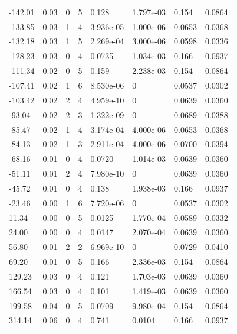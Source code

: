 \documentclass[preview]{standalone}
\begin{document}
{{\begin{tabular}{L{1.2cm}C{1.2cm} C{0.3cm}C{0.5cm} C{1.4cm}C{1.4cm} C{1.4cm}C{1.4cm}}
  -142.01  &  0.03  & 0     &  5 &  0.128  & 1.797e-03  & 0.154 &  0.0864   \\ 
  -133.85  &  0.03  & 1     &  4 &  3.936e-05  & 1.000e-06  & 0.0653 &  0.0368   \\ 
  -132.18  &  0.03  & 1     &  5 &  2.269e-04  & 3.000e-06  & 0.0598 &  0.0336   \\ 
  -128.23  &  0.03  & 0     &  4 &  0.0735  & 1.034e-03  & 0.166 &  0.0937   \\ 
  -111.34  &  0.02  & 0     &  5 &  0.159  & 2.238e-03  & 0.154 &  0.0864   \\ 
  -107.41  &  0.02  & 1     &  6 &  8.530e-06  & 0  & 0.0537 &  0.0302   \\ 
  -103.42  &  0.02  & 2     &  4 &  4.959e-10  & 0  & 0.0639 &  0.0360   \\ 
  -93.04  &  0.02  & 2     &  3 &  1.322e-09  & 0  & 0.0689 &  0.0388   \\ 
  -85.47  &  0.02  & 1     &  4 &  3.174e-04  & 4.000e-06  & 0.0653 &  0.0368   \\ 
  -84.13  &  0.02  & 1     &  3 &  2.911e-04  & 4.000e-06  & 0.0700 &  0.0394   \\ 
  -68.16  &  0.01  & 0     &  4 &  0.0720  & 1.014e-03  & 0.0639 &  0.0360   \\ 
  -51.11  &  0.01  & 2     &  4 &  7.980e-10  & 0  & 0.0639 &  0.0360   \\ 
  -45.72  &  0.01  & 0     &  4 &  0.138  & 1.938e-03  & 0.166 &  0.0937   \\ 
  -23.46  &  0.00  & 1     &  6 &  7.720e-06  & 0  & 0.0537 &  0.0302   \\ 
  11.34  &  0.00  & 0     &  5 &  0.0125  & 1.770e-04  & 0.0589 &  0.0332   \\ 
  24.00  &  0.00  & 0     &  4 &  0.0147  & 2.070e-04  & 0.0639 &  0.0360   \\ 
  56.80  &  0.01  & 2     &  2 &  6.969e-10  & 0  & 0.0729 &  0.0410   \\ 
  69.20  &  0.01  & 0     &  5 &  0.166  & 2.336e-03  & 0.154 &  0.0864   \\ 
  129.23  &  0.03  & 0     &  4 &  0.121  & 1.703e-03  & 0.0639 &  0.0360   \\ 
  166.54  &  0.03  & 0     &  4 &  0.101  & 1.419e-03  & 0.0639 &  0.0360   \\ 
  199.58  &  0.04  & 0     &  5 &  0.0709  & 9.980e-04  & 0.154 &  0.0864   \\ 
  314.14  &  0.06  & 0     &  4 &  0.741  & 0.0104  & 0.166 &  0.0937   \\ 

\end{tabular}}}
\end{document}
